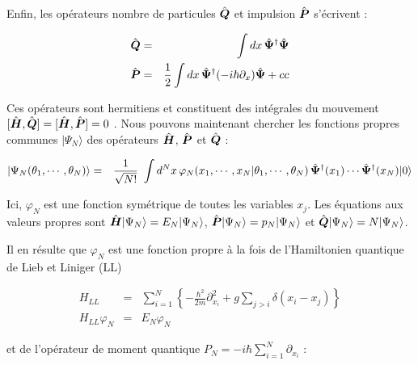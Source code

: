 
Enfin, les opérateurs nombre de particules \( \hat{\bm{Q}} \) et impulsion \( \hat{\bm{P}} \) s’écrivent :

\begin{eqnarray*}
	\hat{\bm{Q}}  &= & \int dx \, \hat{\bm{\Psi}}^\dagger \hat{\bm{\Psi}}\\
	\hat{\bm{P}}  &=& \frac{1}{2} \int dx \, \hat{\bm{\Psi}}^\dagger (-i \hbar \partial_x) \hat{\bm{\Psi	}} + cc
\end{eqnarray*}

Ces opérateurs sont hermitiens et constituent des intégrales du mouvement $[\hat{\bm{H}} , \hat{\bm{Q}} ] = [\hat{\bm{H}} , \hat{\bm{P}}]  = 0 $ . Nous pouvons maintenant chercher les fonctions propres communes \( |\Psi_N\rangle \) des opérateurs \( \hat{\bm{H}} \), \( \hat{\bm{P}} \) et \( \hat{\bm{Q}} \) :

\begin{eqnarray*}
	|\Psi_N ( \theta_1 , \cdots , \theta_N ) \rangle  & = &  \frac{1}{\sqrt{N!}} \int d^N x \, \varphi_N ( x_1 , \cdots , x_N \vert \theta_1 , \cdots , \theta_N ) \, \operator{\Psi}^\dag ( x_1 ) \cdots \operator{\Psi}^\dag ( x_N  ) \vert 0 \rangle 		
\end{eqnarray*}

Ici, \( \varphi_N \) est une fonction symétrique de toutes les variables \( x_j \). Les équations aux valeurs propres sont $\hat{\bm{H}}|\Psi_N \rangle = E_N |\Psi_N \rangle $, $\hat{\bm{P}}|\Psi_N \rangle = p_N |\Psi_N \rangle $ et $\hat{\bm{Q}}|\Psi_N \rangle = N |\Psi_N \rangle $.

Il en résulte que \( \varphi_N \) est une fonction propre à la fois de l'Hamiltonien quantique  de Lieb et Liniger (LL)

\begin{eqnarray*}
	H_{LL} & =& \sum_{i = 1}^N \left \{  - \frac{ \hbar^2}{2m} \partial_{x_i}^2  + g  \sum_{j>i} \delta ( x_i - x_j ) \right \} \\
	H_{LL} \varphi_N & = & E_N \varphi_N 	
\end{eqnarray*}


et de l'opérateur de moment quantique \( P_N  = - i \hbar \sum_{i = 1}^N  \partial_{x_i} \) :
 





















